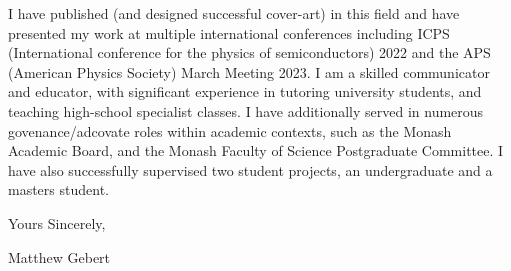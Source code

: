 \documentclass[10pt,a4paper,ragged2e,withhyper,paragraphstrue]{altacv}
\begin{document}
{    %


    
    I have published (and designed successful cover-art) in this field
    and have presented my work at multiple international conferences including ICPS (International conference for the physics of
    semiconductors) 2022 and the APS (American Physics Society) March Meeting 2023. I am a skilled communicator and educator,
    with significant experience in tutoring university students, and teaching high-school specialist classes. I have additionally served
    in numerous govenance/adcovate roles within academic contexts, such as the Monash Academic Board, 
    and the Monash Faculty of Science Postgraduate Committee. I have also successfully supervised two student projects, 
    an undergraduate and a masters student.
    
    \vspace{1em}

    Yours Sincerely, \newline

    {\color{emphasis}Matthew Gebert}

    }
    
    \divider
\end{document}
